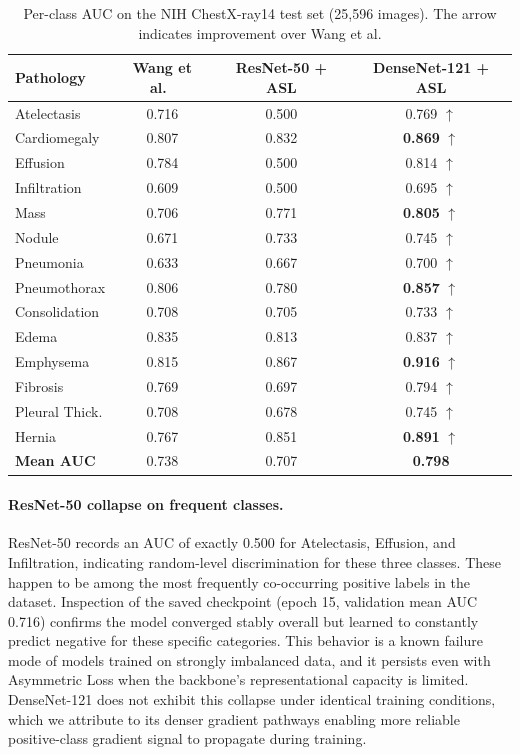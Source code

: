 \documentclass[runningheads]{llncs}
\begin{document}
\begin{table}[t]
\centering
\caption{Per-class AUC on the NIH ChestX-ray14 test set
(25,596 images). The arrow indicates improvement over
Wang et al.}
\label{tab:auc}
\begin{tabular}{lccc}
\toprule
\textbf{Pathology}
  & \textbf{Wang et al.~\cite{wang2017chestxray14}}
  & \textbf{ResNet-50 + ASL}
  & \textbf{DenseNet-121 + ASL} \\
\midrule
Atelectasis         & 0.716 & 0.500 & 0.769 $\uparrow$ \\
Cardiomegaly        & 0.807 & 0.832 & \textbf{0.869} $\uparrow$ \\
Effusion            & 0.784 & 0.500 & 0.814 $\uparrow$ \\
Infiltration        & 0.609 & 0.500 & 0.695 $\uparrow$ \\
Mass                & 0.706 & 0.771 & \textbf{0.805} $\uparrow$ \\
Nodule              & 0.671 & 0.733 & 0.745 $\uparrow$ \\
Pneumonia           & 0.633 & 0.667 & 0.700 $\uparrow$ \\
Pneumothorax        & 0.806 & 0.780 & \textbf{0.857} $\uparrow$ \\
Consolidation       & 0.708 & 0.705 & 0.733 $\uparrow$ \\
Edema               & 0.835 & 0.813 & 0.837 $\uparrow$ \\
Emphysema           & 0.815 & 0.867 & \textbf{0.916} $\uparrow$ \\
Fibrosis            & 0.769 & 0.697 & 0.794 $\uparrow$ \\
Pleural Thick.      & 0.708 & 0.678 & 0.745 $\uparrow$ \\
Hernia              & 0.767 & 0.851 & \textbf{0.891} $\uparrow$ \\
\midrule
\textbf{Mean AUC}   & 0.738 & 0.707 & \textbf{0.798} \\
\bottomrule
\end{tabular}
\end{table}

\paragraph{ResNet-50 collapse on frequent classes.}
ResNet-50 records an AUC of exactly 0.500 for Atelectasis,
Effusion, and Infiltration, indicating random-level discrimination
for these three classes. These happen to be among the most
frequently co-occurring positive labels in the dataset. Inspection
of the saved checkpoint (epoch 15, validation mean AUC 0.716)
confirms the model converged stably overall but learned to
constantly predict negative for these specific categories.
This behavior is a known failure mode of models trained on
strongly imbalanced data, and it persists even with Asymmetric
Loss when the backbone's representational capacity is limited.
DenseNet-121 does not exhibit this collapse under identical
training conditions, which we attribute to its denser gradient
pathways enabling more reliable positive-class gradient signal
to propagate during training.
\end{document}
